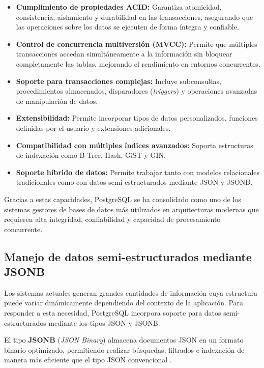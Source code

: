 \documentclass[12pt, oneside, letterpaper]{book}
\begin{document}
\begin{itemize}

\item \textbf{Cumplimiento de propiedades ACID:} Garantiza atomicidad, consistencia, aislamiento y durabilidad en las transacciones, asegurando que las operaciones sobre los datos se ejecuten de forma íntegra y confiable.

\item \textbf{Control de concurrencia multiversión (MVCC):} Permite que múltiples transacciones accedan simultáneamente a la información sin bloquear completamente las tablas, mejorando el rendimiento en entornos concurrentes.

\item \textbf{Soporte para transacciones complejas:} Incluye subconsultas, procedimientos almacenados, disparadores (\textit{triggers}) y operaciones avanzadas de manipulación de datos.

\item \textbf{Extensibilidad:} Permite incorporar tipos de datos personalizados, funciones definidas por el usuario y extensiones adicionales.

\item \textbf{Compatibilidad con múltiples índices avanzados:} Soporta estructuras de indexación como B-Tree, Hash, GiST y GIN.

\item \textbf{Soporte híbrido de datos:} Permite trabajar tanto con modelos relacionales tradicionales como con datos semi-estructurados mediante JSON y JSONB.
\end{itemize}

Gracias a estas capacidades, PostgreSQL se ha consolidado como uno de los sistemas gestores de bases de datos más utilizados en arquitecturas modernas que requieren alta integridad, confiabilidad y capacidad de procesamiento concurrente.

\subsection{Manejo de datos semi-estructurados mediante JSONB}

Los sistemas actuales generan grandes cantidades de información cuya estructura puede variar dinámicamente dependiendo del contexto de la aplicación. Para responder a esta necesidad, PostgreSQL incorpora soporte para datos semi-estructurados mediante los tipos JSON y JSONB.

El tipo \textbf{JSONB} (\textit{JSON Binary}) almacena documentos JSON en un formato binario optimizado, permitiendo realizar búsquedas, filtrados e indexación de manera más eficiente que el tipo JSON convencional \cite{60}.
\end{document}
